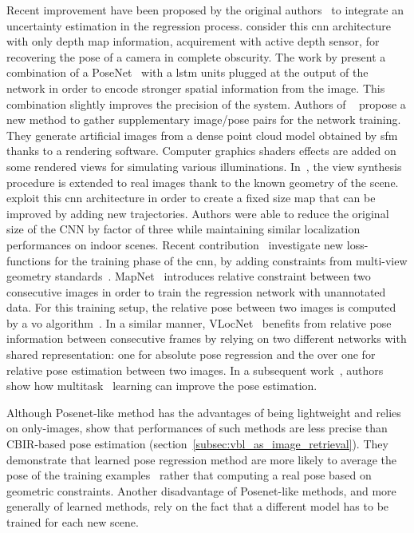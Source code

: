 Recent improvement have been proposed by the original authors~\citep{Kendall2016} to integrate an uncertainty estimation in the regression process. \citet{Liu2016} consider this \ac{cnn} architecture with only depth map information, acquirement with active depth sensor, for recovering the pose of a camera in complete obscurity. The work by \citet{Walch2016a} present a combination of a PoseNet~\citep{Kendall2015} with a \ac{lstm} units plugged at the output of the network in order to encode stronger spatial information from the image. This combination slightly improves the precision of the system. Authors of ~\citep{Jia2016} propose a new method to gather supplementary image/pose pairs for the network training. They generate artificial images from a dense point cloud model obtained by \ac{sfm} thanks to a rendering software. Computer graphics shaders effects are added on some rendered views for simulating various illuminations. In~\citep{Purkait2018}, the view synthesis procedure is extended to real images thank to the known geometry of the scene. \citet{Contreras2017} exploit this \ac{cnn} architecture in order to create a fixed size map that can be improved by adding new trajectories. Authors were able to reduce the original size of the CNN by factor of three while maintaining similar localization performances on indoor scenes. Recent contribution~\citep{Kendall2017} investigate new loss-functions for the training phase of the \ac{cnn}, by adding constraints from multi-view geometry standards~\citep{Hartley2003}. MapNet~\citep{Brahmbhatt2017a} introduces relative constraint between two consecutive images in order to train the regression network with unannotated data. For this training setup, the relative pose between two images is computed by a \ac{vo} algorithm~\citep{engel2017direct,forster2016svo}. In a similar manner, VLocNet~\citep{Valada2018} benefits from relative pose information between consecutive frames by relying on two different networks with shared representation: one for absolute pose regression and the over one for relative pose estimation between two images. In a subsequent work~\citep{Radwan2018,Valada}, authors show how multitask~\citep{kokkinos2017ubernet,Kendall2017a,Zamir2018} learning can improve the pose estimation.

Although Posenet-like method has the advantages of being lightweight and relies on only-images, \citet{Sattler2019} show that performances of such methods are less precise than CBIR-based pose estimation (section~\ref{subsec:vbl_as_image_retrieval}). They demonstrate that learned pose regression method are more likely to average the pose of the training examples~\citep{Torii2013} rather that computing a real pose based on geometric constraints. Another disadvantage of Posenet-like methods, and more generally of learned methods, rely on the fact that a different model has to be trained for each new scene.

